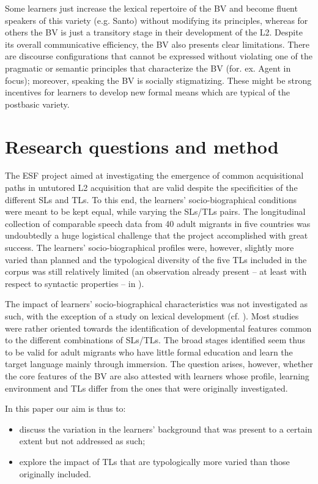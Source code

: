 \documentclass[output=paper]{langscibook}
\begin{document}
Some learners just increase the lexical repertoire of the BV and become fluent speakers of this variety (e.g. Santo) without modifying its principles, whereas for others the BV is just a transitory stage in their development of the L2. Despite its overall communicative efficiency, the BV also presents clear limitations. There are discourse configurations that cannot be expressed without violating one of the pragmatic or semantic principles that characterize the BV (for. ex. Agent in focus); moreover, speaking the BV is socially stigmatizing. These might be strong incentives for learners to develop new formal means which are typical of the postbasic variety.

\section{Research questions and method}\label{sec:benazzo:3}

The ESF project aimed at investigating the emergence of common acquisitional paths in untutored L2 acquisition that are valid despite the specificities of the different SLs and TLs. To this end, the learners’ socio-biographical conditions were meant to be kept equal, while varying the SLs/TLs pairs. The longitudinal collection of comparable speech data from 40 adult migrants in five countries was undoubtedly a huge logistical challenge that the project accomplished with great success. The learners’ socio-biographical profiles were, however, slightly more varied than planned and the typological diversity of the five TLs included in the corpus was still relatively limited (an observation already present -- at least with respect to syntactic properties -- in \citealt{Schwartz1997}). 

The impact of learners’ socio-biographical characteristics was not investigated as such, with the exception of a study on lexical development (cf. \citealt{vanHoutStrömqvist1993}). Most studies were rather oriented towards the identification of developmental features common to the different combinations of SLs/TLs. The broad stages identified seem thus to be valid for adult migrants who have little formal education and learn the target language mainly through immersion. The question arises, however, whether the core features of the BV are also attested with learners whose profile, learning environment and TLs differ from the ones that were originally investigated. 

In this paper our aim is thus to:

\begin{itemize}
\item discuss the variation in the learners’ background that was present to a certain extent but not addressed as such;
\item explore the impact of TLs that are typologically more varied than those originally included. 
\end{itemize}
\end{document}
